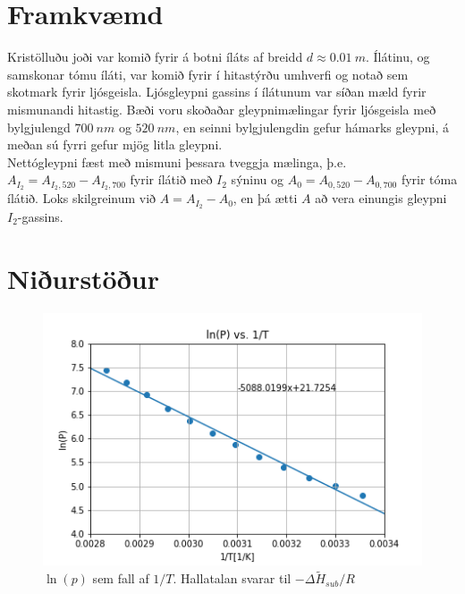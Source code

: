 \documentclass[11pt]{article}
\begin{document}
\section{Framkvæmd}
Kristölluðu joði var komið fyrir á botni íláts af breidd $d \approx \SI{0.01}{m}$. Ílátinu, og samskonar tómu íláti, var komið fyrir í hitastýrðu umhverfi og notað sem skotmark fyrir ljósgeisla. Ljósgleypni gassins í ílátunum var síðan mæld fyrir mismunandi hitastig. Bæði voru skoðaðar gleypnimælingar fyrir ljósgeisla með bylgjulengd $\SI{700}{nm}$ og $\SI{520}{nm}$, en seinni bylgjulengdin gefur hámarks gleypni, á meðan sú fyrri gefur mjög litla gleypni.\\
Nettógleypni fæst með mismuni þessara tveggja mælinga, þ.e. $A_{I_2} = A_{I_2, 520} - A_{I_2, 700}$ fyrir ílátið með $I_2$ sýninu og $A_{0} = A_{0, 520} - A_{0, 700}$ fyrir tóma ílátið. Loks skilgreinum við $A = A_{I_2} - A_{0}$, en þá ætti $A$ að vera einungis gleypni $I_2$-gassins. 






\section{Niðurstöður}

\begin{figure}[H]
    \centering
    \includegraphics[scale=0.8]{mynd1.png}
    \caption{$\ln(p)$ sem fall af $1/T$. Hallatalan svarar til $-\Delta \widetilde{H}_{sub}/R$}
    \label{fig:mynd1}
\end{figure}
\end{document}
